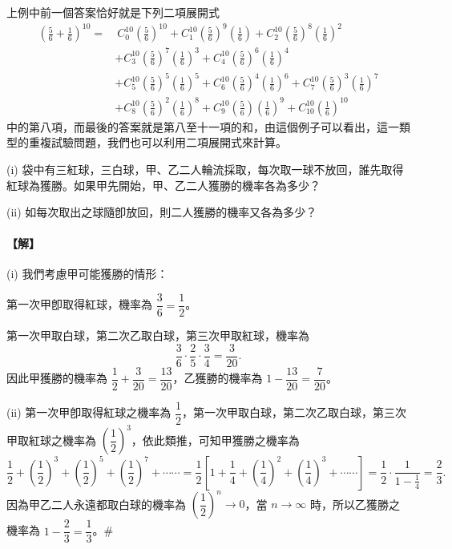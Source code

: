 上例中前一個答案恰好就是下列二項展開式
\begin{align*}
\left(\frac{5}{6} + \frac{1}{6}\right)^{10} = & \ C_0^{10} \left(\frac{5}{6}\right)^{10} + C_1^{10} \left(\frac{5}{6}\right)^9 \left(\frac{1}{6}\right) + C_2^{10} \left(\frac{5}{6}\right)^8 \left(\frac{1}{6}\right)^2 \\
& + C_3^{10} \left(\frac{5}{6}\right)^7 \left(\frac{1}{6}\right)^3 + C_4^{10} \left(\frac{5}{6}\right)^6 \left(\frac{1}{6}\right)^4 \\
& + C_5^{10} \left(\frac{5}{6}\right)^5 \left(\frac{1}{6}\right)^5 + C_6^{10} \left(\frac{5}{6}\right)^4 \left(\frac{1}{6}\right)^6 + C_7^{10} \left(\frac{5}{6}\right)^3 \left(\frac{1}{6}\right)^7 \\
& + C_8^{10} \left(\frac{5}{6}\right)^2 \left(\frac{1}{6}\right)^8 + C_9^{10} \left(\frac{5}{6}\right) \left(\frac{1}{6}\right)^9 + C_{10}^{10} \left(\frac{1}{6}\right)^{10}
\end{align*}
中的第八項，而最後的答案就是第八至十一項的和，由這個例子可以看出，這一類型的重複試驗問題，我們也可以利用二項展開式來計算。

\vspace{1em}
\begin{discussion}\label{disc:b5s-3-7}
(i) 袋中有三紅球，三白球，甲、乙二人輪流採取，每次取一球不放回，誰先取得紅球為獲勝。如果甲先開始，甲、乙二人獲勝的機率各為多少？

(ii) 如每次取出之球隨卽放回，則二人獲勝的機率又各為多少？
\end{discussion}
\paragraph{【解】}
(i) 我們考慮甲可能獲勝的情形：

第一次甲卽取得紅球，機率為 $\dfrac{3}{6} = \dfrac{1}{2}$。

第一次甲取白球，第二次乙取白球，第三次甲取紅球，機率為
\[
\frac{3}{6} \cdot \frac{2}{5} \cdot \frac{3}{4} = \frac{3}{20}.
\]
因此甲獲勝的機率為 $\dfrac{1}{2} + \dfrac{3}{20} = \dfrac{13}{20}$，乙獲勝的機率為 $1 - \dfrac{13}{20} = \dfrac{7}{20}$。

(ii) 第一次甲卽取得紅球之機率為 $\dfrac{1}{2}$，第一次甲取白球，第二次乙取白球，第三次甲取紅球之機率為 $\left(\dfrac{1}{2}\right)^3$，依此類推，可知甲獲勝之機率為
\[
\frac{1}{2} + \left(\frac{1}{2}\right)^3 + \left(\frac{1}{2}\right)^5 + \left(\frac{1}{2}\right)^7 + \cdots\cdots = \frac{1}{2}\left[1 + \frac{1}{4} + \left(\frac{1}{4}\right)^2 + \left(\frac{1}{4}\right)^3 + \cdots\cdots\right] = \frac{1}{2} \cdot \frac{1}{1 - \frac{1}{4}} = \frac{2}{3}.
\]
因為甲乙二人永遠都取白球的機率為 $\left(\dfrac{1}{2}\right)^n \longrightarrow 0$，當 $n \longrightarrow \infty$ 時，所以乙獲勝之機率為 $1 - \dfrac{2}{3} = \dfrac{1}{3}$。\hfill\#

